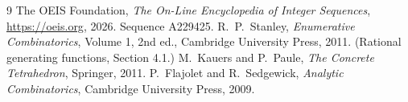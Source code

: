 \documentclass[11pt,a4paper]{article}
\theoremstyle{plain}
\theoremstyle{definition}
\begin{document}
\begin{thebibliography}{9}
 The OEIS Foundation, \emph{The On-Line Encyclopedia of Integer
Sequences}, \url{https://oeis.org}, 2026. Sequence A229425.
 R.~P.~Stanley, \emph{Enumerative Combinatorics}, Volume 1, 2nd ed.,
Cambridge University Press, 2011. (Rational generating functions, Section 4.1.)
 M.~Kauers and P.~Paule, \emph{The Concrete Tetrahedron}, Springer, 2011.
 P.~Flajolet and R.~Sedgewick, \emph{Analytic Combinatorics}, Cambridge
University Press, 2009.
\end{thebibliography}
\end{document}
